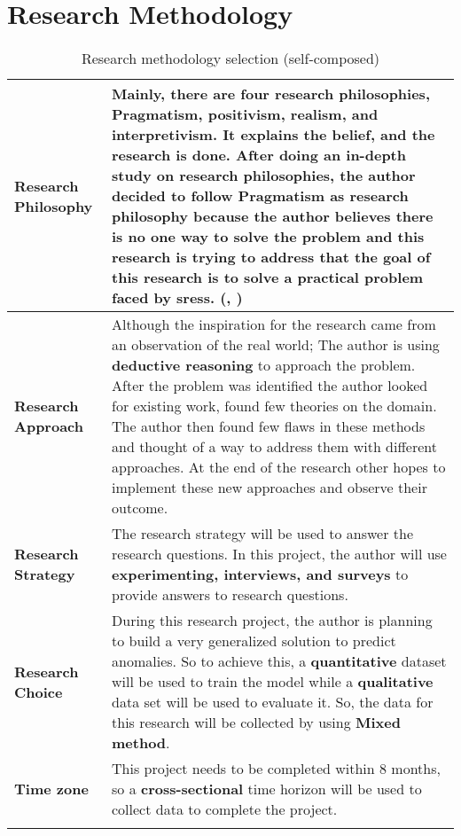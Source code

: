 \section{Research Methodology} \label{sec:methodology}


\begin{longtable}{|p{35mm}|p{125mm}|}
\hline
  \textbf{Research Philosophy} & 
  Mainly, there are four research philosophies, Pragmatism, positivism, realism, and interpretivism. It explains the belief, and the research is done. After doing an in-depth study on research philosophies, the author decided to follow \textbf{Pragmatism} as research philosophy because the author believes there is no one way to solve the problem and this research is trying to address that the goal of this research is to solve a practical problem faced by \acp{sres}. (\cite{1Philoso75:online}, \cite{Pragmati87:online})
  \\ \hline
  
  \textbf{Research Approach} & 
  Although the inspiration for the research came from an observation of the real world; The author is using \textbf{deductive reasoning} to approach the problem. After the problem was identified the author looked for existing work, found few theories on the domain. The author then found few flaws in these methods and thought of a way to address them with different approaches. At the end of the research other hopes to implement these new approaches and observe their outcome.
  \\ \hline
  
  \textbf{Research Strategy} & 
  The research strategy will be used to answer the research questions. In this project, the author will use \textbf{experimenting, interviews, and surveys} to provide answers to research questions.
  \\ \hline
  
  \textbf{Research Choice} & 
  During this research project, the author is planning to build a very generalized solution to predict anomalies.  So to achieve this, a \textbf{quantitative} dataset will be used to train the model while a \textbf{qualitative} data set will be used to evaluate it. So, the data for this research will be collected by using \textbf{Mixed method}.
  \\ \hline
  
  \textbf{Time zone} & 
  This project needs to be completed within 8 months, so a \textbf{cross-sectional} time horizon will be used to collect data to complete the project.
  \\ \hline
  \caption{Research methodology selection (self-composed)}
\end{longtable}
